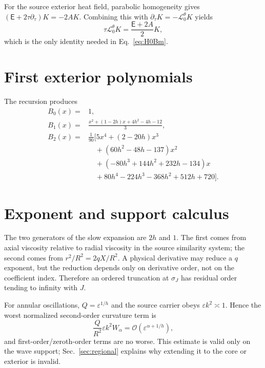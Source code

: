 \documentclass[aps,prd,reprint,superscriptaddress,nofootinbib,floatfix]{revtex4-2}
\theoremstyle{definition}
\theoremstyle{remark}
\newcommand{\cL}{\mathcal{L}}
\newcommand{\eps}{\varepsilon}
\newcommand{\OO}{\mathcal{O}}
\newcommand{\Eul}{\mathsf E}
\begin{document}
For the source exterior heat field, parabolic homogeneity gives
$(\Eul+2\tau\partial_\tau)K=-2AK$. Combining this with
$\partial_\tau K=-\cL_0^\theta K$ yields
\begin{equation}
	\tau\cL_0^\theta K=\frac{\Eul+2A}{2}K,
\end{equation}
which is the only identity needed in Eq.~\eqref{eq:H0Bm}.


\section{First exterior polynomials}\label{app:Bpoly}

The recursion produces
\begin{align}
	B_0(x)={} & 1,                                         \\
	B_1(x)={} & \frac{x^2+(1-2h)x+4h^2-4h-12}{3},          \\
	B_2(x)={} & \frac1{90}\bigl[5x^4+(2-20h)x^3\nonumber   \\
	          & \quad +(60h^2-48h-137)x^2\nonumber         \\
	          & \quad +(-80h^3+144h^2+232h-134)x\nonumber  \\
	          & \quad +80h^4-224h^3-368h^2+512h+720\bigr].
\end{align}



\section{Exponent and support calculus}\label{app:expcheck}

The two generators of the slow expansion are $2h$ and $1$. The first comes from axial viscosity relative to radial viscosity in the source similarity system; the second comes from $r^2/R^2=2qX/R^2$. A physical derivative may reduce a $q$ exponent, but the reduction depends only on derivative order, not on the coefficient index. Therefore an ordered truncation at $\sigma_J$ has residual order tending to infinity with $J$.

For annular oscillations, $Q=\eps^{1/h}$ and the source carrier obeys $\eps k^2\asymp1$. Hence the worst normalized second-order curvature term is
\begin{equation}
	\frac{Q}{R^2}\eps k^2 W_\alpha
	=\OO(\eps^{\alpha+1/h}),
\end{equation}
and first-order/zeroth-order terms are no worse. This estimate is valid only on the wave support; Sec.~\ref{sec:regional} explains why extending it to the core or exterior is invalid.
\end{document}
